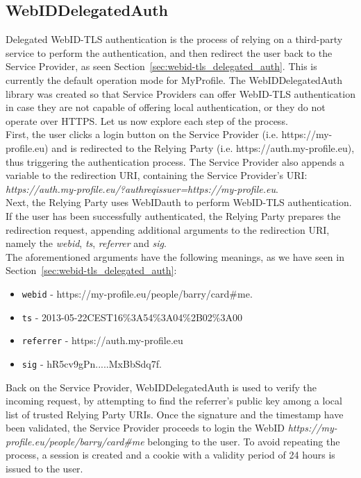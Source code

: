\subsection{WebIDDelegatedAuth}
Delegated WebID-TLS authentication is the process of relying on a third-party service to perform the authentication, and then redirect the user back to the Service Provider, as seen Section~\ref{sec:webid-tls_delegated_auth}. This is currently the default operation mode for MyProfile. The WebIDDelegatedAuth library was created so that Service Providers can offer WebID-TLS authentication in case they are not capable of offering local authentication, or they do not operate over HTTPS. Let us now explore each step of the process.\\

First, the user clicks a login button on the Service Provider (i.e. https://my-profile.eu) and is redirected to the Relying Party (i.e. https://auth.my-profile.eu), thus triggering the authentication process. The Service Provider also appends a variable to the redirection URI, containing the Service Provider's URI:\\ 
\textit{https://auth.my-profile.eu/?authreqissuer=https://my-profile.eu}.\\

Next, the Relying Party uses WebIDauth to perform WebID-TLS authentication. If the user has been successfully authenticated, the Relying Party prepares the redirection request, appending additional arguments to the redirection URI, namely the \textit{webid}, \textit{ts}, \textit{referrer} and \textit{sig}.\\

The aforementioned arguments have the following meanings, as we have seen in Section~\ref{sec:webid-tls_delegated_auth}:

\begin{itemize}
\item \verb+webid+ - https://my-profile.eu/people/barry/card\#me.
\item \verb+ts+ - 2013-05-22CEST16\%3A54\%3A04\%2B02\%3A00
\item \verb+referrer+ - https://auth.my-profile.eu
\item \verb+sig+ - hR5cv9gPn.....MxBbSdq7f.
\end{itemize}

Back on the Service Provider, WebIDDelegatedAuth is used to verify the incoming request, by attempting to find the referrer's public key among a local list of trusted Relying Party URIs. Once the signature and the timestamp have been validated, the Service Provider proceeds to login the WebID \textit{https://my-profile.eu/people/barry/card\#me} belonging to the user. To avoid repeating the process, a session is created and a cookie with a validity period of 24 hours is issued to the user.\\

